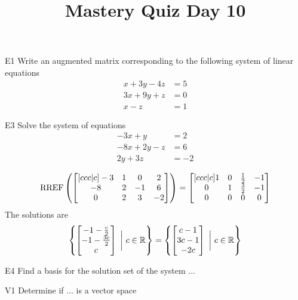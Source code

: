 \documentclass{sbgLAquiz}
\title{Mastery Quiz Day 10 }
\begin{document}
\begin{problem}{E1}
Write an augmented matrix corresponding to the following system of linear equations
\begin{align*}
x+3y-4z &= 5 \\
3x+9y+z &= 0 \\
x-z &= 1
\end{align*}
\end{problem}

\begin{problem}{E3}
Solve the system of equations
\begin{align*}
-3x +y &= 2\\
-8x+2y-z &= 6 \\
2y+3z &= -2
\end{align*}


\end{problem}

\begin{solution}
$$\operatorname{RREF}\left(\begin{bmatrix}[ccc|c] -3 & 1 & 0 & 2 \\ -8 & 2 & -1 & 6 \\ 0 & 2 & 3 & -2 \end{bmatrix} \right) = \begin{bmatrix}[ccc|c] 1 & 0 & \frac{1}{2} & -1 \\ 0 & 1 & \frac{3}{2} & -1 \\ 0 & 0 & 0 & 0 \end{bmatrix}$$
The solutions are $$\left\{ \begin{bmatrix} -1-\frac{c}{2} \\ -1-\frac{3c}{2} \\ c \end{bmatrix}\ \bigg|\ c\in \mathbb{R}\right\} = \left\{ \begin{bmatrix} c-1 \\ 3c-1 \\ -2c  \end{bmatrix}\ \bigg|\ c\in \mathbb{R}\right\}$$
\end{solution}

\begin{extract}\newpage\end{extract}
\begin{problem}{E4}
Find a basis for the solution set of the system ...
\end{problem}
\begin{problem}{V1}
Determine if ... is a vector space
\end{problem}
\begin{solution}

\end{solution}
\end{document}
